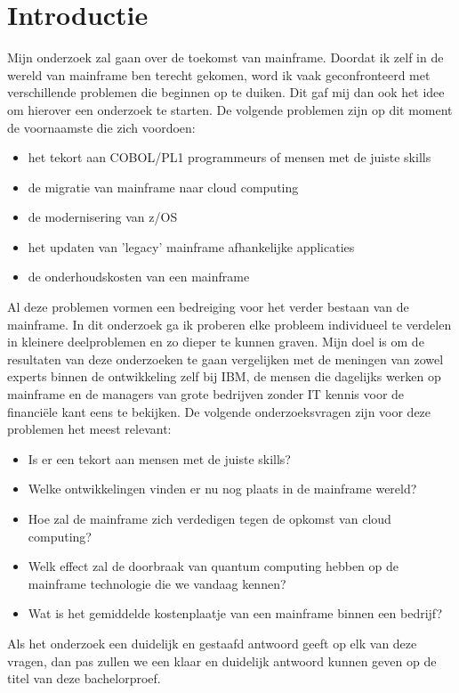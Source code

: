
\section{Introductie} %
\label{sec:introductie}
Mijn onderzoek zal gaan over de toekomst van mainframe. Doordat ik zelf in de wereld van mainframe ben terecht gekomen, word ik vaak geconfronteerd
met verschillende problemen die beginnen op te duiken. Dit gaf mij dan ook het idee om hierover een onderzoek te starten. De volgende problemen zijn op dit moment de voornaamste die zich voordoen:
\begin{itemize}
  \item het tekort aan COBOL/PL1 programmeurs of mensen met de juiste skills
  \item de migratie van mainframe naar cloud computing
  \item de modernisering van z/OS
  \item het updaten van 'legacy' mainframe afhankelijke applicaties
  \item de onderhoudskosten van een mainframe
\end{itemize}
Al deze problemen vormen een bedreiging voor het verder bestaan van de mainframe. In dit onderzoek ga ik proberen elke probleem individueel te verdelen in kleinere deelproblemen en zo dieper te kunnen graven. Mijn doel is om de resultaten van deze onderzoeken te gaan vergelijken met de meningen van zowel experts binnen de ontwikkeling zelf bij IBM, de mensen die dagelijks werken op mainframe en de managers van grote bedrijven zonder IT kennis voor de financiële kant eens te bekijken. De volgende onderzoeksvragen zijn voor deze problemen het meest relevant:
\begin{itemize} 
  \item Is er een tekort aan mensen met de juiste skills?
  \item Welke ontwikkelingen vinden er nu nog plaats in de mainframe wereld?
  \item Hoe zal de mainframe zich verdedigen tegen de opkomst van cloud computing?
  \item Welk effect zal de doorbraak van quantum computing hebben op de mainframe technologie die we vandaag kennen?
  \item Wat is het gemiddelde kostenplaatje van een mainframe binnen een bedrijf?
\end{itemize}
Als het onderzoek een duidelijk en gestaafd antwoord geeft op elk van deze vragen, dan pas zullen we een klaar en duidelijk antwoord kunnen geven op 
de titel van deze bachelorproef.

